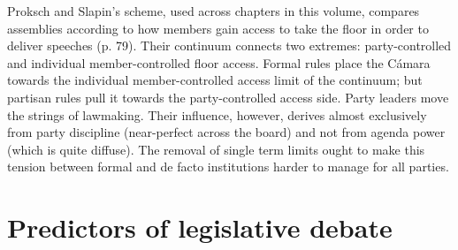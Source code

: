 \documentclass[letter,12pt]{article}
\begin{document}
Proksch and Slapin's \citeyearpar{proksch-slapin2015book} scheme, used across chapters in this volume, compares assemblies according to how members gain access to take the floor in order to deliver speeches (p. 79). Their continuum connects two extremes: party-controlled and individual member-controlled floor access. Formal rules place the Cámara towards the individual member-controlled access limit of the continuum; but partisan rules pull it towards the party-controlled access side. Party leaders move the strings of lawmaking. Their influence, however, derives almost exclusively from party discipline (near-perfect across the board) and not from agenda power (which is quite diffuse). The removal of single term limits ought to make this tension between formal and de facto institutions harder to manage for all parties.  

\section{Predictors of legislative debate} %
 

\end{document}
